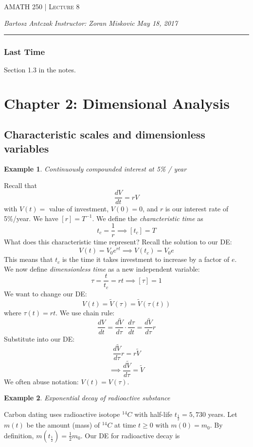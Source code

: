 \documentclass{report}
\newcommand{\lectureNum}{8}
\newcommand{\curDate}{May 18, 2017}
\newcommand{\course}{AMATH 250}
\newcommand{\instructor}{Zoran Miskovic}
\newtheorem{ex}{Example}[section]
\begin{document}
\begin{center}
\begin{Large}
\textsc{\course{} | Lecture \lectureNum{}}
\end{Large}
\end{center} 
\noindent \textit{Bartosz Antczak} \hfill
\textit{Instructor: \instructor{}} \hfill
\textit{\curDate{}}
\rule{\textwidth}{0.4pt}
\subsubsection{Last Time}
Section 1.3 in the notes.
\section{Chapter 2: Dimensional Analysis}
\subsection{Characteristic scales and dimensionless variables}
\begin{ex}
Continuously compounded interest at 5\% / year
\end{ex}\noindent
Recall that
$$\frac{dV}{dt} = rV$$
with $V(t) = $ value of investment, $V(0) = 0$, and $r$ is our interest rate of 5\%/year. We have $[r] = T^{-1}$. We define the \textit{characteristic time} as
$$t_c = \frac{1}{r} \implies [t_c] = T$$
What does this characteristic time represent? Recall the solution to our DE:
$$V(t) = V_0e^{rt} \implies V(t_c) = V_0e$$
This means that $t_c$ is the time it takes investment to increase by a factor of $e$. \\
We now define \textit{dimensionless time} as a new independent variable:
$$\tau = \frac{t}{t_c} = rt \implies [\tau] = 1$$
We want to change our DE:
$$V(t) = \widetilde{V}(\tau) = \widetilde{V}(\tau(t))$$
where $\tau(t) = rt$. We use chain rule:
$$\frac{dV}{dt} = \frac{d\widetilde{V}}{d\tau} \cdot \frac{d\tau}{dt} = \frac{d\widetilde{V}}{d\tau} r$$
Substitute into our DE:
$$\frac{d\widetilde{V}}{d\tau}r = r\widetilde{V}$$
$$\implies \frac{d\widetilde{V}}{d\tau} = \widetilde{V}$$
We often abuse notation: $V(t) = V(\tau)$.
\begin{ex}
Exponential decay of radioactive substance
\end{ex}\noindent
Carbon dating uses radioactive isotope $^{14}C$ with half-life $t_{\frac{1}{2}} = 5,730$ years. Let $m(t)$ be the amount (mass) of $^{14}C$ at time $t \geq 0$ with $m(0)=m_0$. By definition, $m\left(t_{\frac{1}{2}}\right) = \frac{1}{2}m_0$. Our DE for radioactive decay is
\end{document}
